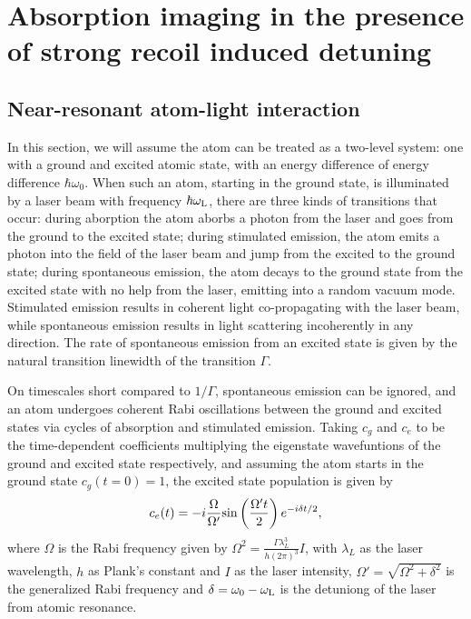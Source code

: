 
\renewcommand{\thechapter}{2}


\chapter{Absorption imaging in the presence of strong recoil induced detuning}


\section{Near-resonant atom-light interaction}\label{chap:2sec:atomLight}

In this section, we will assume the atom can be treated as a two-level system: one with a ground and excited atomic state, with an energy difference of energy difference $\hbar\omega_0$. When such an atom, starting in the ground state, is illuminated by a laser beam with frequency $\hbar\omega_{\rm{L}}$, there are three kinds of transitions that occur: during aborption the atom aborbs a photon from the laser and goes from the ground to the excited state; during stimulated emission, the atom emits a photon into the field of the laser beam and jump from the excited to the ground state; during spontaneous emission, the atom decays to the ground state from the excited state with no help from the laser, emitting into a random vacuum mode. Stimulated emission results in coherent light co-propagating with the laser beam, while spontaneous emission results in light scattering incoherently in any direction. The rate of spontaneous emission from an excited state is given by the natural transition linewidth of the transition $\Gamma$. 

On timescales short compared to $1/\Gamma$, spontaneous emission can be ignored, and an atom undergoes coherent Rabi oscillations between the ground and excited states via cycles of absorption and stimulated emission\cite{LCT}. Taking $c_g$ and $c_e$ to be the time-dependent coefficients multiplying the eigenstate wavefuntions of the ground and excited state respectively, and assuming the atom starts in the ground state $c_g(t=0)=1$, the excited state population is given by
\begin{equation}
c_e(t)=-i\frac{\Omega}{\Omega'}{\rm sin}\left(\frac{\Omega't}{2}\right)e^{-i\delta t/2},
\end{equation}
where $\Omega$ is the Rabi frequency given by $\Omega^2 = \frac{\Gamma\lambda_L^3}{h(2\pi)^3}I$, with $\lambda_L$ as the laser wavelength, $h$ as Plank's constant and $I$ as the laser intensity,  $\Omega'=\sqrt{\Omega^2+\delta^2}$ is the generalized Rabi frequency and $\delta=\omega_0-\omega_{\rm{L}}$ is the detuniong of the laser from atomic resonance. 

